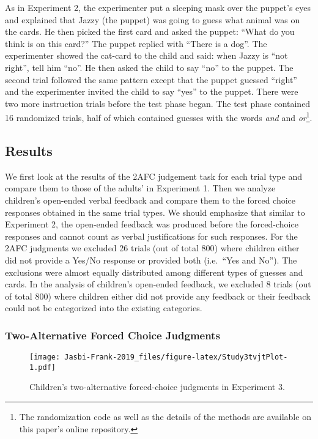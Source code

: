 \documentclass[
  english,
  ,man,floatsintext]{apa6}
\begin{document}
As in Experiment 2, the experimenter put a sleeping mask over the puppet's eyes and explained that Jazzy (the puppet) was going to guess what animal was on the cards. He then picked the first card and asked the puppet: \enquote{What do you think is on this card?} The puppet replied with \enquote{There is a dog}. The experimenter showed the cat-card to the child and said: when Jazzy is \enquote{not right}, tell him \enquote{no}. He then asked the child to say \enquote{no} to the puppet. The second trial followed the same pattern except that the puppet guessed \enquote{right} and the experimenter invited the child to say \enquote{yes} to the puppet. There were two more instruction trials before the test phase began. The test phase contained 16 randomized trials, half of which contained guesses with the words \emph{and} and \emph{or}\footnote{The randomization code as well as the details of the methods are available on this paper's online repository.}.

\hypertarget{results-2}{%
\subsection{Results}\label{results-2}}

We first look at the results of the 2AFC judgement task for each trial type and compare them to those of the adults' in Experiment 1. Then we analyze children's open-ended verbal feedback and compare them to the forced choice responses obtained in the same trial types. We should emphasize that similar to Experiment 2, the open-ended feedback was produced before the forced-choice responses and cannot count as verbal justifications for such responses. For the 2AFC judgments we excluded 26 trials (out of total 800) where children either did not provide a Yes/No response or provided both (i.e.~\enquote{Yes and No}). The exclusions were almost equally distributed among different types of guesses and cards. In the analysis of children's open-ended feedback, we excluded 8 trials (out of total 800) where children either did not provide any feedback or their feedback could not be categorized into the existing categories.

\hypertarget{two-alternative-forced-choice-judgments}{%
\subsubsection{Two-Alternative Forced Choice Judgments}\label{two-alternative-forced-choice-judgments}}

\begin{figure}
\centering
\texttt{[image: Jasbi-Frank-2019\_files/figure-latex/Study3tvjtPlot-1.pdf]}
\caption{\label{fig:Study3tvjtPlot}Children's two-alternative forced-choice judgments in Experiment 3.}
\end{figure}
\end{document}
